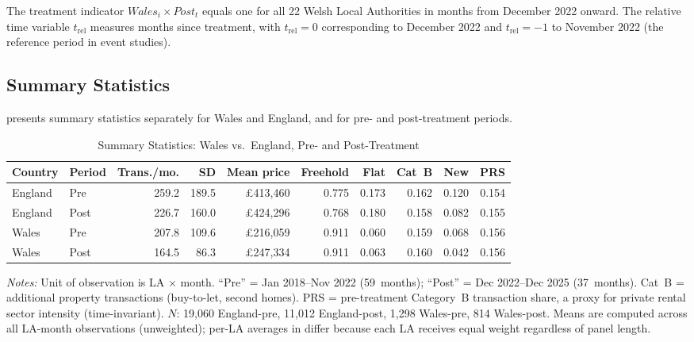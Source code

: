 \documentclass[12pt]{article}
\begin{document}
The treatment indicator $\mathit{Wales}_i \times \mathit{Post}_t$ equals one for all 22 Welsh Local Authorities in months from December 2022 onward. The relative time variable $t_{\text{rel}}$ measures months since treatment, with $t_{\text{rel}} = 0$ corresponding to December 2022 and $t_{\text{rel}} = -1$ to November 2022 (the reference period in event studies).

\subsection{Summary Statistics}

 presents summary statistics separately for Wales and England, and for pre- and post-treatment periods.

\begin{table}[H]
\centering
\caption{Summary Statistics: Wales vs.\ England, Pre- and Post-Treatment}
\label{tab:sumstats}
\begin{adjustbox}{max width=\textwidth}
\begin{tabular}{llrrrrrrrr}
\toprule
Country & Period & Trans./mo. & SD & Mean price & Freehold & Flat & Cat~B & New & PRS \\
\midrule
England & Pre & 259.2 & 189.5 & \pounds413,460 & 0.775 & 0.173 & 0.162 & 0.120 & 0.154 \\
England & Post & 226.7 & 160.0 & \pounds424,296 & 0.768 & 0.180 & 0.158 & 0.082 & 0.155 \\
Wales & Pre & 207.8 & 109.6 & \pounds216,059 & 0.911 & 0.060 & 0.159 & 0.068 & 0.156 \\
Wales & Post & 164.5 & 86.3 & \pounds247,334 & 0.911 & 0.063 & 0.160 & 0.042 & 0.156 \\
\bottomrule
\end{tabular}
\end{adjustbox}
\par\vspace{0.3em}
{\footnotesize \textit{Notes:} Unit of observation is LA $\times$ month.
``Pre'' = Jan 2018--Nov 2022 (59~months); ``Post'' = Dec 2022--Dec 2025 (37~months).
Cat~B = additional property transactions (buy-to-let, second homes).
PRS = pre-treatment Category~B transaction share, a proxy for private rental sector intensity (time-invariant).
$N$: 19,060 England-pre, 11,012 England-post, 1,298 Wales-pre, 814 Wales-post. Means are computed across all LA-month observations (unweighted); per-LA averages in  differ because each LA receives equal weight regardless of panel length.}
\end{table}
\end{document}
